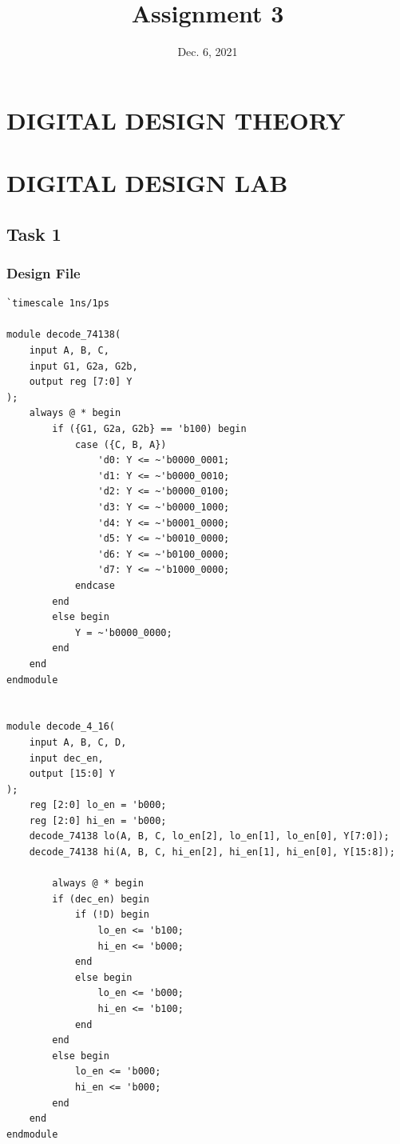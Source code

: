 \documentclass[onecolumn, oneside, ctexart]{SUSTechHomework}
\title{Assignment 3}
\date{Dec. 6, 2021}
\begin{document}
  \maketitle
\section{DIGITAL DESIGN THEORY}








\section{DIGITAL DESIGN LAB}

\subsection*{Task 1}
\subsubsection*{Design File}
\begin{lstlisting}
`timescale 1ns/1ps

module decode_74138(
    input A, B, C,
    input G1, G2a, G2b,
    output reg [7:0] Y
);
    always @ * begin
        if ({G1, G2a, G2b} == 'b100) begin
            case ({C, B, A})
                'd0: Y <= ~'b0000_0001;
                'd1: Y <= ~'b0000_0010;
                'd2: Y <= ~'b0000_0100;
                'd3: Y <= ~'b0000_1000;
                'd4: Y <= ~'b0001_0000;
                'd5: Y <= ~'b0010_0000;
                'd6: Y <= ~'b0100_0000;
                'd7: Y <= ~'b1000_0000;
            endcase
        end
        else begin
            Y = ~'b0000_0000;
        end
    end
endmodule


module decode_4_16(
    input A, B, C, D,
    input dec_en,
    output [15:0] Y
);
    reg [2:0] lo_en = 'b000;
    reg [2:0] hi_en = 'b000;
    decode_74138 lo(A, B, C, lo_en[2], lo_en[1], lo_en[0], Y[7:0]);
    decode_74138 hi(A, B, C, hi_en[2], hi_en[1], hi_en[0], Y[15:8]);

        always @ * begin
        if (dec_en) begin
            if (!D) begin
                lo_en <= 'b100;
                hi_en <= 'b000;
            end
            else begin
                lo_en <= 'b000;
                hi_en <= 'b100;
            end
        end
        else begin
            lo_en <= 'b000;
            hi_en <= 'b000;
        end
    end
endmodule
\end{lstlisting}
\vspace{-2em}
\end{document}
